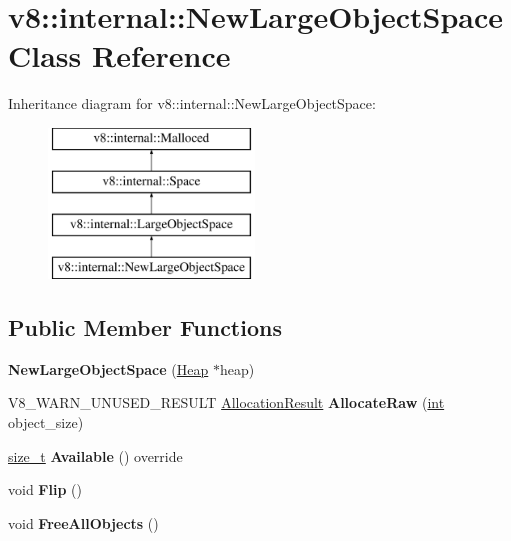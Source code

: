 \hypertarget{classv8_1_1internal_1_1NewLargeObjectSpace}{}\section{v8\+:\+:internal\+:\+:New\+Large\+Object\+Space Class Reference}
\label{classv8_1_1internal_1_1NewLargeObjectSpace}
Inheritance diagram for v8\+:\+:internal\+:\+:New\+Large\+Object\+Space\+:\begin{figure}[H]
\begin{center}
\leavevmode
\includegraphics[height=4.000000cm]{classv8_1_1internal_1_1NewLargeObjectSpace}
\end{center}
\end{figure}
\subsection*{Public Member Functions}
\begin{DoxyCompactItemize}
\item 
\mbox{\label{classv8_1_1internal_1_1NewLargeObjectSpace_a1b65cebb805339403b73ce8b304ee659}} 
{\bfseries New\+Large\+Object\+Space} (\mbox{\hyperlink{classv8_1_1internal_1_1Heap}{Heap}} $\ast$heap)
\item 
\mbox{\label{classv8_1_1internal_1_1NewLargeObjectSpace_a2ebacf99a849f7c802b21b9334e4badb}} 
V8\+\_\+\+W\+A\+R\+N\+\_\+\+U\+N\+U\+S\+E\+D\+\_\+\+R\+E\+S\+U\+LT \mbox{\hyperlink{classv8_1_1internal_1_1AllocationResult}{Allocation\+Result}} {\bfseries Allocate\+Raw} (\mbox{\hyperlink{classint}{int}} object\+\_\+size)
\item 
\mbox{\label{classv8_1_1internal_1_1NewLargeObjectSpace_a8720ce6fbd3a485e7fdd74dee071ca5a}} 
\mbox{\hyperlink{classsize__t}{size\+\_\+t}} {\bfseries Available} () override
\item 
\mbox{\label{classv8_1_1internal_1_1NewLargeObjectSpace_a235266ffb16e5e9cefa6d949b7235748}} 
void {\bfseries Flip} ()
\item 
\mbox{\label{classv8_1_1internal_1_1NewLargeObjectSpace_a7e744e7124e83c7152eb25aa26a74251}} 
void {\bfseries Free\+All\+Objects} ()
\end{DoxyCompactItemize}

